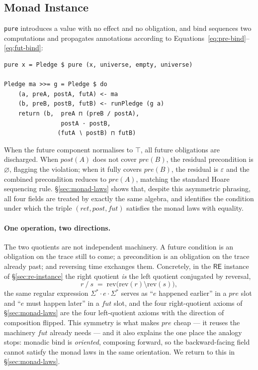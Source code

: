 \documentclass[acmsmall,screen]{acmart}
\newcommand{\RE}{\mathsf{RE}}
\newcommand{\pre}{\mathit{pre}}
\newcommand{\post}{\mathit{post}}
\newcommand{\fut}{\mathit{fut}}
\newcommand{\ret}{\mathit{ret}}
\newcommand{\lquot}{\mathbin{\setminus}}   %
\newcommand{\rquot}{\mathbin{/}}           %
\begin{document}
\subsection{Monad Instance}

\lstinline{pure} introduces a value with no effect and no obligation, and
bind sequences two computations and propagates annotations according to
Equations~\eqref{eq:pre-bind}--\eqref{eq:fut-bind}:
\begin{lstlisting}
pure x = Pledge $ pure (x, universe, empty, universe)

Pledge ma >>= g = Pledge $ do
    (a, preA, postA, futA) <- ma
    (b, preB, postB, futB) <- runPledge (g a)
    return (b,  preA ⊓ (preB ∕ postA),
                postA · postB,
               (futA ∖ postB) ⊓ futB)
\end{lstlisting}
When the future component normalises to $\top$, all future obligations are
discharged.
When $\post(A)$ does not cover $\pre(B)$, the residual precondition is
$\varnothing$, flagging the violation; when it fully covers $\pre(B)$, the
residual is $\varepsilon$ and the combined precondition reduces to
$\pre(A)$, matching the standard Hoare sequencing rule.
\S\ref{sec:monad-laws} shows that, despite this asymmetric phrasing, all
four fields are treated by exactly the same algebra, and identifies the
condition under which the triple $(\ret, \post, \fut)$ satisfies the monad
laws with equality.

\paragraph{One operation, two directions.}
The two quotients are not independent machinery.
A future condition is an obligation on the trace still to come; a
precondition is an obligation on the trace already past; and reversing time
exchanges them.
Concretely, in the $\RE$ instance of \S\ref{sec:re-instance} the right
quotient \emph{is} the left quotient conjugated by reversal,
\[
  r \rquot s \;=\; \mathrm{rev}\bigl(\mathrm{rev}(r) \lquot \mathrm{rev}(s)\bigr),
\]
the same regular expression $\Sigma^* \cdot e \cdot \Sigma^*$ serves as
``$e$ happened earlier'' in a $\pre$ slot and ``$e$ must happen later'' in a
$\fut$ slot, and the four right-quotient axioms of \S\ref{sec:monad-laws}
are the four left-quotient axioms with the direction of composition flipped.
This symmetry is what makes $\pre$ cheap --- it reuses the machinery
$\fut$ already needs --- and it also explains the one place the analogy
stops: monadic bind is \emph{oriented}, composing forward, so the
backward-facing field cannot satisfy the monad laws in the same
orientation.
We return to this in \S\ref{sec:monad-laws}.
\end{document}
